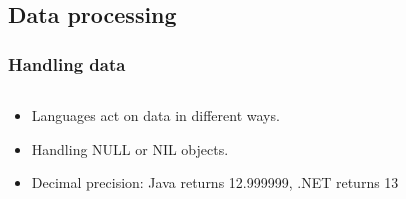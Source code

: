 \documentclass{beamer}
\begin{document}
\subsection{Data processing}
\begin{frame}
  \frametitle{Handling data}
  
  \begin{columns}
  \begin{column}{0.5\textwidth}
  \begin{itemize}
  \item Languages act on data in different ways. %
  \item Handling NULL or NIL objects.
  \item Decimal precision: Java returns 12.999999, .NET returns 13
  \end{itemize}
  \end{column}
  

\end{columns}
\end{frame}
\end{document}
